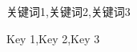 
\pagestyle{empty}

\begin{cnabstract}{关键词1,关键词2,关键词3}
	\zhlipsum[1][name = zhufu]
\end{cnabstract}

\begin{enabstract}{Key 1,Key 2,Key 3}
	\lipsum[1]
\end{enabstract}